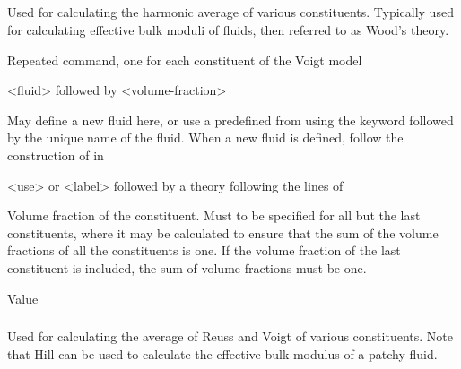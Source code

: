 {\subparagraph{}
 \slist
   \item \Description Used for calculating the harmonic average of various constituents. Typically used for calculating effective bulk moduli of fluids, then referred to as Wood's theory. 
   \item \Argument
   \item \Default 
 \elist

 \slist
   \item \Description Repeated command, one for each constituent of the Voigt model
   \item \Argument <fluid> followed by <volume-fraction>
   \item \Default
 \elist

 \slist
   \item \Description May define a new fluid here, or use a predefined  from  using the keyword  followed by the unique name of the fluid. When a new fluid is defined, follow the construction of  in 
   \item \Argument <use> or <label> followed by a theory following the lines of 
   \item \Default
 \elist

 \slist
   \item \Description Volume fraction of the constituent. Must to be specified for all but the last constituents, where it may be calculated to ensure that the sum of the volume fractions of all the constituents is one. If the volume fraction of the last constituent is included, the sum of volume fractions must be one. 
   \item \Argument Value
   \item \Default
 \elist

\subparagraph{}
 \slist
   \item \Description Used for calculating the average of Reuss and Voigt of various constituents. Note that Hill can be used to calculate the effective bulk modulus of a patchy fluid.
   \item \Argument
   \item \Default 
 \elist

}
